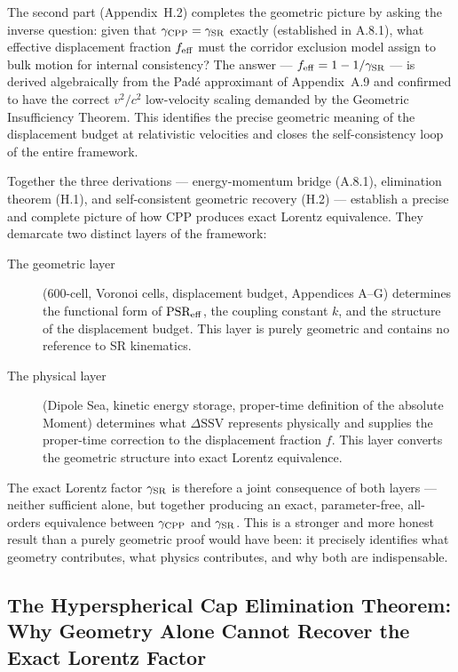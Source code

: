 \documentclass[11pt,letterpaper]{article}
\begin{document}
The second part (Appendix~H.2) completes the geometric picture by asking the inverse question: given that $\gamma_{\rm CPP} = 
\gamma_{\rm SR}$ exactly (established in A.8.1), what effective displacement fraction $f_{\rm eff}$ must the corridor exclusion model 
assign to bulk motion for internal consistency? The answer — $f_{\rm eff} = 1 - 1/\gamma_{\rm SR}$ — is derived algebraically from 
the Padé approximant of Appendix~A.9 and confirmed to have the correct $v^2/c^2$ low-velocity scaling demanded by the Geometric Insufficiency 
Theorem. This identifies the precise geometric meaning of the displacement budget at relativistic velocities and closes the 
self-consistency loop of the entire framework.

Together the three derivations — energy-momentum bridge (A.8.1), elimination theorem (H.1), and self-consistent geometric recovery (H.2) — establish a precise and complete picture of how CPP produces exact Lorentz equivalence. They demarcate two distinct layers of the framework:

\begin{description}
\item[The geometric layer] (600-cell, Voronoi cells, displacement budget, Appendices A--G) determines the functional form of $\text{PSR}_{\rm eff}$, the coupling constant $k$, and the structure of the displacement budget. This layer is purely geometric and contains no reference to SR kinematics.

\item[The physical layer] (Dipole Sea, kinetic energy storage, 
proper-time definition of the absolute Moment) determines what 
$\Delta\text{SSV}$ represents physically and supplies the proper-time correction to the displacement fraction $f$. This layer converts the geometric structure into exact Lorentz equivalence.
\end{description}

The exact Lorentz factor $\gamma_{\rm SR}$ is therefore a joint consequence of both layers — neither sufficient alone, but together producing an exact, parameter-free, all-orders equivalence between $\gamma_{\rm CPP}$ and $\gamma_{\rm SR}$. This is a stronger and more honest result than a purely geometric proof would have been: it precisely identifies what geometry contributes, what physics contributes, and why both are indispensable.

\subsection{The Hyperspherical Cap Elimination Theorem: Why Geometry Alone Cannot Recover the Exact Lorentz Factor}
\label{app:H1}
\end{document}
